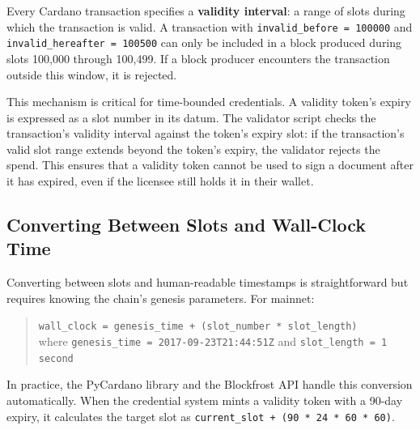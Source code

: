 Every Cardano transaction specifies a \textbf{validity interval}:
a range of slots during which the transaction is valid. A transaction
with \texttt{invalid\_before = 100000} and
\texttt{invalid\_hereafter = 100500} can only be included in a block
produced during slots 100,000 through 100,499. If a block producer
encounters the transaction outside this window, it is rejected.

This mechanism is critical for time-bounded credentials. A validity
token's expiry is expressed as a slot number in its datum. The validator
script checks the transaction's validity interval against the token's
expiry slot: if the transaction's valid slot range extends beyond the
token's expiry, the validator rejects the spend. This ensures that a
validity token cannot be used to sign a document after it has expired,
even if the licensee still holds it in their wallet.

\subsection{Converting Between Slots and Wall-Clock Time}

Converting between slots and human-readable timestamps is
straightforward but requires knowing the chain's genesis parameters. For
mainnet:

\begin{quote}
\texttt{wall\_clock = genesis\_time + (slot\_number * slot\_length)}\\
where \texttt{genesis\_time = 2017-09-23T21:44:51Z}
and \texttt{slot\_length = 1 second}
\end{quote}

In practice, the PyCardano library and the Blockfrost API handle this
conversion automatically. When the credential system mints a validity
token with a 90-day expiry, it calculates the target slot as
\texttt{current\_slot + (90 * 24 * 60 * 60)}.

